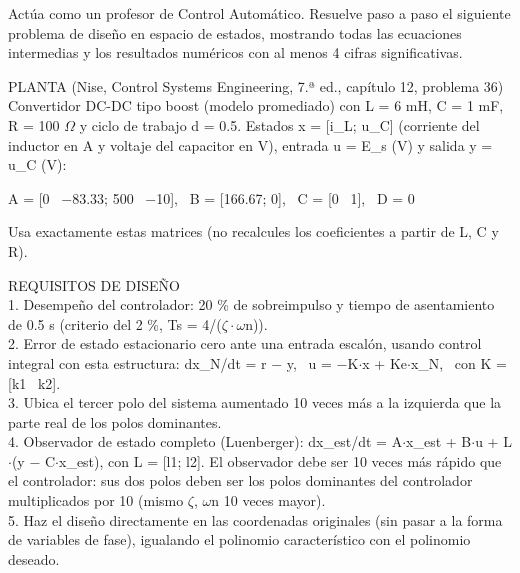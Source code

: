 \documentclass[conference]{IEEEtran}
\begin{document}
\begin{framed}
\small
\noindent Actúa como un profesor de Control Automático. Resuelve paso a paso el siguiente problema de diseño en espacio de estados, mostrando todas las ecuaciones intermedias y los resultados numéricos con al menos 4 cifras significativas.

\smallskip\noindent PLANTA (Nise, Control Systems Engineering, 7.ª ed., capítulo 12, problema 36)\\
Convertidor DC-DC tipo boost (modelo promediado) con L = 6 mH, C = 1 mF, R = 100 $\Omega$ y ciclo de trabajo d = 0.5. Estados x = [i\_L; u\_C] (corriente del inductor en A y voltaje del capacitor en V), entrada u = E\_s (V) y salida y = u\_C (V):

\smallskip\noindent A = [0 \ $-$83.33; 500 \ $-$10], \ B = [166.67; 0], \ C = [0 \ 1], \ D = 0

\smallskip\noindent Usa exactamente estas matrices (no recalcules los coeficientes a partir de L, C y R).

\smallskip\noindent REQUISITOS DE DISEÑO\\
1. Desempeño del controlador: 20 \% de sobreimpulso y tiempo de asentamiento de 0.5 s (criterio del 2 \%, Ts = 4/($\zeta\cdot\omega$n)).\\
2. Error de estado estacionario cero ante una entrada escalón, usando control integral con esta estructura: dx\_N/dt = r $-$ y, \ u = $-$K$\cdot$x + Ke$\cdot$x\_N, \ con K = [k1 \ k2].\\
3. Ubica el tercer polo del sistema aumentado 10 veces más a la izquierda que la parte real de los polos dominantes.\\
4. Observador de estado completo (Luenberger): dx\_est/dt = A$\cdot$x\_est + B$\cdot$u + L$\cdot$(y $-$ C$\cdot$x\_est), con L = [l1; l2]. El observador debe ser 10 veces más rápido que el controlador: sus dos polos deben ser los polos dominantes del controlador multiplicados por 10 (mismo $\zeta$, $\omega$n 10 veces mayor).\\
5. Haz el diseño directamente en las coordenadas originales (sin pasar a la forma de variables de fase), igualando el polinomio característico con el polinomio deseado.


\end{framed}
\end{document}
